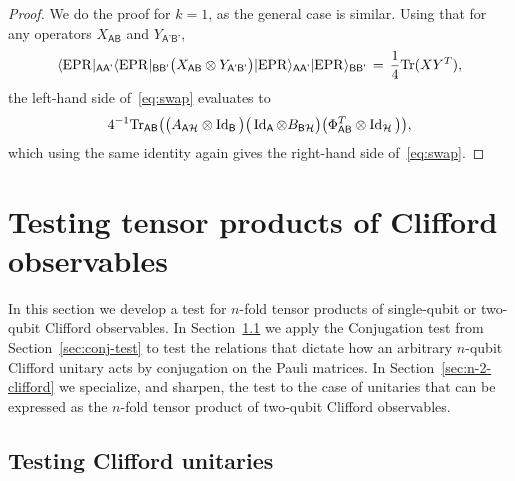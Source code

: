 \documentclass[11pt]{article}
\theoremstyle{remark}
\theoremstyle{definition}
\newcommand{\ket}[1]{|#1\rangle}
\newcommand{\bra}[1]{\langle#1|}
\newcommand{\Tr}{\mbox{\rm Tr}}
\newcommand{\Id}{\ensuremath{\mathop{\rm Id}\nolimits}}
\newcommand{\reg}[1]{{\textsf{#1}}}
\newcommand{\mH}{\mathcal{H}}
\newcommand{\EPR}{{\rm EPR}}
\newcommand{\SWAP}{\textsc{SW}}
\begin{document}
\begin{proof}
We do the proof for $k=1$, as the general case is similar. Using that for any operators $X_{\reg{AB}} $ and $ Y_{\reg{A'B'}}$, 
$$\bra{\EPR}_{\reg{AA'}}\bra{\EPR}_{\reg{BB'}} \big( X_{\reg{AB}} \otimes Y_{\reg{A'B'}} \big) \ket{\EPR}_{\reg{AA'}}\ket{\EPR}_{\reg{BB'}} \,=\, \frac{1}{4}\Tr(XY^T),$$
the left-hand side of~\eqref{eq:swap} evaluates to 
$$4^{-1} \Tr_{\reg{AB}}\big( \big(A_{\reg{A}\mH} \otimes \Id_\reg{B}\big)\big( \Id_\reg{A}\otimes B _{\reg{B}\mH}\big)\big(\Phi_{\reg{AB}}^T\otimes \Id_\mH\big)\big),$$
 which using the same identity again 
gives the right-hand side of~\eqref{eq:swap}.
\end{proof}



\section{Testing tensor products of Clifford observables}
\label{sec:clifford}

In this section we develop a test for $n$-fold tensor products of single-qubit or two-qubit Clifford observables. In Section~\ref{sec:n-clifford} we apply the Conjugation test from Section~\ref{sec:conj-test}  to test the relations that dictate how an arbitrary $n$-qubit Clifford unitary acts by conjugation on the Pauli matrices. In Section~\ref{sec:n-2-clifford} we specialize, and sharpen, the test to the case of unitaries that can be expressed as the $n$-fold tensor product of two-qubit Clifford observables.  


\subsection{Testing Clifford unitaries}
\label{sec:n-clifford}
\end{document}
